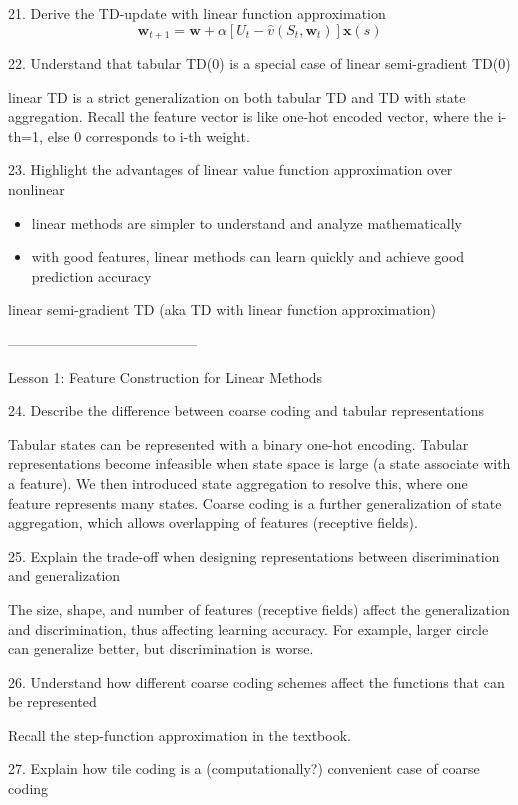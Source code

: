 \documentclass[sutton_barto_notes.tex]{subfiles}
\begin{document}
21. Derive the TD-update with linear function approximation 
$$\bm{w}_{t+1} = \bm{w} + \alpha[U_t - \hat{v}(S_t, \bm{w}_t)]\bm{x}(s)$$

22. Understand that tabular TD(0) is a special case of linear semi-gradient TD(0)

linear TD is a strict generalization on both tabular TD and TD with state aggregation. Recall the feature vector is like one-hot encoded vector, where the i-th=1, else 0 corresponds to i-th weight. 

23. Highlight the advantages of linear value function approximation over nonlinear 

\begin{itemize}
\item linear methods are simpler to understand and analyze mathematically
\item with good features, linear methods can learn quickly and achieve good prediction accuracy
\end{itemize}

linear semi-gradient TD (aka TD with linear function approximation)

-----------------------------------------

Lesson 1: Feature Construction for Linear Methods 

24. Describe the difference between coarse coding and tabular representations 

Tabular states can be represented with a binary one-hot encoding. Tabular representations become infeasible when state space is large (a state associate with a feature). We then introduced state aggregation to resolve this, where one feature represents many states.
Coarse coding is a further generalization of state aggregation, which allows overlapping of features (receptive fields).

25. Explain the trade-off when designing representations between discrimination and generalization 

The size, shape, and number of features (receptive fields) affect the generalization and discrimination, thus affecting learning accuracy.
For example, larger circle can generalize better, but discrimination is   worse.

26. Understand how different coarse coding schemes affect the functions that can be represented 

Recall the step-function approximation in the textbook.

27. Explain how tile coding is a (computationally?) convenient case of coarse coding 
\end{document}
